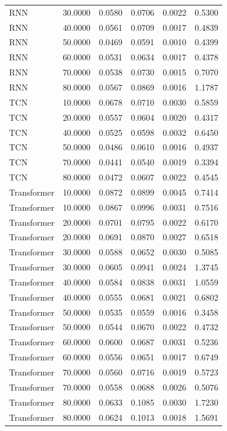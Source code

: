 \begin{tabular}{lrrrrr}
RNN & 30.0000 & 0.0580 & 0.0706 & 0.0022 & 0.5300 \\
RNN & 40.0000 & 0.0561 & 0.0709 & 0.0017 & 0.4839 \\
RNN & 50.0000 & 0.0469 & 0.0591 & 0.0010 & 0.4399 \\
RNN & 60.0000 & 0.0531 & 0.0634 & 0.0017 & 0.4378 \\
RNN & 70.0000 & 0.0538 & 0.0730 & 0.0015 & 0.7070 \\
RNN & 80.0000 & 0.0567 & 0.0869 & 0.0016 & 1.1787 \\
TCN & 10.0000 & 0.0678 & 0.0710 & 0.0030 & 0.5859 \\
TCN & 20.0000 & 0.0557 & 0.0604 & 0.0020 & 0.4317 \\
TCN & 40.0000 & 0.0525 & 0.0598 & 0.0032 & 0.6450 \\
TCN & 50.0000 & 0.0486 & 0.0610 & 0.0016 & 0.4937 \\
TCN & 70.0000 & 0.0441 & 0.0540 & 0.0019 & 0.3394 \\
TCN & 80.0000 & 0.0472 & 0.0607 & 0.0022 & 0.4545 \\
Transformer & 10.0000 & 0.0872 & 0.0899 & 0.0045 & 0.7414 \\
Transformer & 10.0000 & 0.0867 & 0.0996 & 0.0031 & 0.7516 \\
Transformer & 20.0000 & 0.0701 & 0.0795 & 0.0022 & 0.6170 \\
Transformer & 20.0000 & 0.0691 & 0.0870 & 0.0027 & 0.6518 \\
Transformer & 30.0000 & 0.0588 & 0.0652 & 0.0030 & 0.5085 \\
Transformer & 30.0000 & 0.0605 & 0.0941 & 0.0024 & 1.3745 \\
Transformer & 40.0000 & 0.0584 & 0.0838 & 0.0031 & 1.0559 \\
Transformer & 40.0000 & 0.0555 & 0.0681 & 0.0021 & 0.6802 \\
Transformer & 50.0000 & 0.0535 & 0.0559 & 0.0016 & 0.3458 \\
Transformer & 50.0000 & 0.0544 & 0.0670 & 0.0022 & 0.4732 \\
Transformer & 60.0000 & 0.0600 & 0.0687 & 0.0031 & 0.5236 \\
Transformer & 60.0000 & 0.0556 & 0.0651 & 0.0017 & 0.6749 \\
Transformer & 70.0000 & 0.0560 & 0.0716 & 0.0019 & 0.5723 \\
Transformer & 70.0000 & 0.0558 & 0.0688 & 0.0026 & 0.5076 \\
Transformer & 80.0000 & 0.0633 & 0.1085 & 0.0030 & 1.7230 \\
Transformer & 80.0000 & 0.0624 & 0.1013 & 0.0018 & 1.5691 \\
\bottomrule
\end{tabular}

